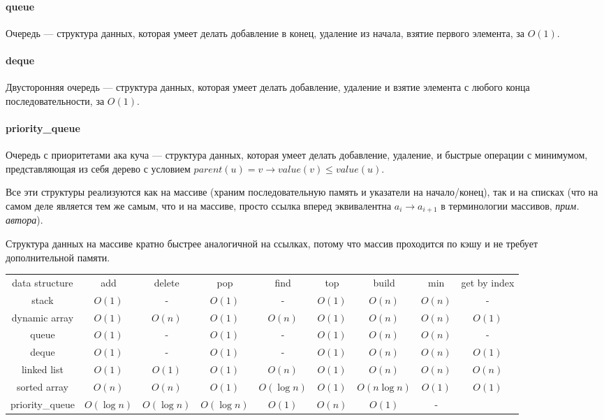 \documentclass[12pt]{article}
\begin{document}
\paragraph{queue}
Очередь --- структура данных, которая умеет делать добавление в конец, удаление из начала, взятие первого элемента, за $O(1)$.

\paragraph{deque}
Двусторонняя очередь --- структура данных, которая умеет делать добавление, удаление и взятие элемента с любого конца последовательности, за $O(1)$.

\paragraph{priority\_queue}
Очередь с приоритетами ака куча --- структура данных, которая умеет делать добавление, удаление, и быстрые операции с минимумом, представляющая из себя дерево с условием $parent(u) = v \rightarrow value(v) \le value(u)$.


Все эти структуры реализуются как на массиве (храним последовательную память и указатели на начало/конец), так и на списках (что на самом деле является тем же самым, что и на массиве, просто ссылка вперед эквивалентна $a_i \rightarrow a_{i + 1}$ в терминологии массивов, \textit{прим. автора}).

Структура данных на массиве кратно быстрее аналогичной на ссылках, потому что массив проходится по кэшу и не требует дополнительной памяти.

\begin{center}
\begin{tabular}{c c c c c c c c c}
data structure & add & delete & pop & find & top & build & min & get by index\\
stack & $O(1)$ & - & $O(1)$ & - & $O(1)$ & $O(n)$ & $O(n)$ & -\\
dynamic array & $O(1)$ & $O(n)$ & $O(1)$ & $O(n)$ & $O(1)$ & $O(n)$ & $O(n)$ & $O(1)$ \\
queue & $O(1)$ & - & $O(1)$ & - & $O(1)$ & $O(n)$ & $O(n)$ & -\\
deque & $O(1)$ & - & $O(1)$ & - & $O(1)$ & $O(n)$ & $O(n)$ & $O(1)$\\
linked list & $O(1)$ & $O(1)$ & $O(1)$ & $O(n)$ & $O(1)$ & $O(n)$ & $O(n)$ & $O(n)$\\
sorted array& $O(n)$ & $O(n)$ & $O(1)$ & $O(\log n)$ & $O(1)$ & $O(n \log n)$ & $O(1)$ & $O(1)$ \\
priority\_queue& $O(\log n)$ & $O(\log n)$ & $O(\log n)$ & $O(1)$ & $O(n)$ & $O(1)$ & -
\end{tabular}
\end{center}
\end{document}
